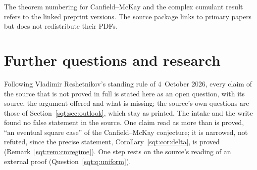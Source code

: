 The theorem numbering for Canfield--McKay and the complex cumulant result refers to the linked preprint versions. The source package links to primary papers but does not redistribute their PDFs.

\section{Further questions and research}\label{sqt:sec:further}
\begin{writenote}
Following Vladimir Reshetnikov's standing rule of 4~October 2026, every
claim of the source that is not proved in full is stated here as an open
question, with its source, the argument offered and what is missing; the
source's own questions are those of Section~\ref{sqt:sec:outlook}, which
stay as printed. The intake and the write found no false statement in the
source. One claim read as more than is proved, ``an eventual square case''
of the Canfield--McKay conjecture; it is narrowed, not refuted, since the
precise statement, Corollary~\ref{sqt:cor:delta}, is proved
(Remark~\ref{sqt:rem:cmregime}). One step rests on the source's reading of
an external proof (Question~\ref{sqt:q:uniform}).
\end{writenote}
